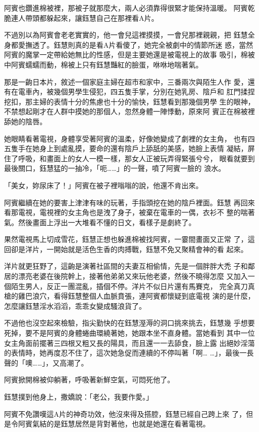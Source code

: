 阿賓也鑽進棉被裡，那被子就那麼大，兩人必須靠得很緊才能保持溫暖。
阿賓乾脆連人帶頭都躲起來，讓鈺慧自己在那裡看A片。

不過別以為阿賓會老老實實的，他一會兒這裡摸摸，一會兒那裡親親，把
鈺慧全身都愛撫透了。鈺慧則真的是看A片看傻了，她完全被劇中的情節所迷
惑，當然阿賓的魔掌一定帶給她無比的性感，但是主要她還是被電視上的故事
吸引，棉被中阿賓蠕蠕而動，棉被上只有鈺慧豔紅的臉蛋，咻咻地喘著氣。

那是一齣日本片，敘述一個家庭主婦在超市和家中，三番兩次與陌生人作
愛，還有在電車內，被幾個男學生侵犯，四五隻手掌，分別在她乳房、陰戶和
肛門揉捏挖扣，那主婦的表情十分的焦慮也十分的愉快，鈺慧看到那幾個男學
生的眼神，不禁想起剛才在人群中摸她的那個人，忽然身體一陣悸動，原來阿
賓正在棉被裡舔她的陰唇。

她眼睛看著電視，身體享受著阿賓的溫柔，好像她變成了劇裡的女主角，
也有四五隻手在她身上到處亂摸，要命的還有陰戶上舔舐的美感，她臉上表情
凝結，屏住了呼吸，和畫面上的女人一模一樣，那女人正被玩弄得緊張兮兮，
眼看就要到最後關口，鈺慧猛的一抽冷，「呃……」的一聲，噴了阿賓一臉的
浪水。

「美女，妳尿床了！」阿賓在被子裡嗡嗡的說，他還不肯出來。

阿賓繼續在她的要害上津津有味的玩著，手指頭挖在她的陰戶裡面。鈺慧
再回來看那電視，電視裡的女主角也是洩了身子，被棄在電車的一偶，衣衫不
整的喘著氣。然後畫面上浮出一大堆看不懂的日文，看樣子是劇終了。

果然電視馬上切成雪花，鈺慧正想也躲進棉被找阿賓，一霎間畫面又正常
了，這回卻是洋片，一開始就是活色生香的肉搏戰，鈺慧不免又聚精會神的看
起來。

洋片就更狂野了，這齣是演著社區間的夫妻互相偷情，先是一個胖胖大禿
子和鄰居的漂亮老婆在後院幹上，接著他弟弟又來玩他老婆，然後不曉得怎麼
又加入一個陌生男人，反正一團混亂，插個不停。洋片不似日片還有馬賽克，
完全真刀真槍的雞巴浪穴，看得鈺慧整個人血脈賁張，連阿賓都懷疑到底電視
演的是什麼，怎麼讓鈺慧淫水滔滔，乖乖女變成騷浪貨了。

不過他也沒空起來檢驗，指尖勤快的在鈺慧溼溽的洞口挑來挑去，鈺慧幾
乎想要死掉，要不是阿賓的身體蜷曲環繞著她，她跟本坐不直身體。當她看到
其中一位女主角面前擺著三四根又粗又長的陽具，而且還一一去舔食，臉上露
出絕妙淫蕩的表情時，她再度忍不住了，這次她急促而連續的不停叫著「啊…
…」，最後一長聲的「噢……」，又高潮了。

阿賓掀開棉被仰躺著，呼吸著新鮮空氣，可悶死他了。

鈺慧撲到他身上，撒嬌說：「老公，我要作愛。」

阿賓不免讚嘆這A片的神奇功效，他沒來得及搭腔，鈺慧已經自己跨上來
了，但是令阿賓氣結的是鈺慧居然是背對著他，也就是她還在看著電視。

